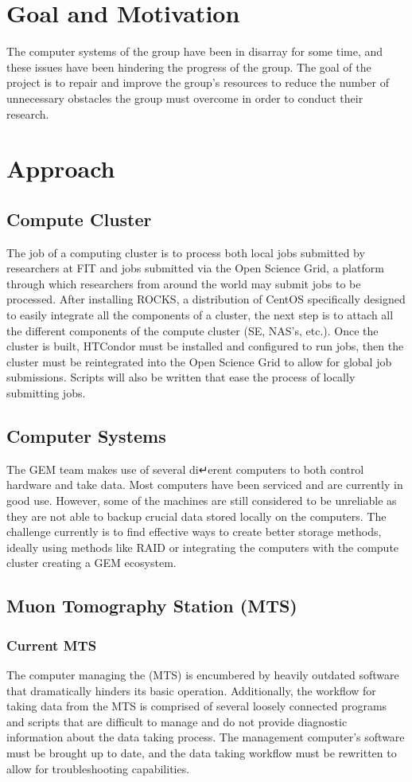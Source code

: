 \documentclass[12pt]{article}
\newcommand\tab[1][1cm]{\hspace*{#1}}
\begin{document}
\section{Goal and Motivation}
\tab The computer systems of the group have been in disarray for
some time, and these issues have been hindering the progress of
the group. The goal of the project is to repair and improve the
group’s resources to reduce the number of unnecessary obstacles
the group must overcome in order to conduct their research.
\section{Approach}
\subsection{Compute Cluster}
\tab The job of a computing cluster is to process both local jobs
submitted by researchers at FIT and jobs submitted via the Open
Science Grid, a platform through which researchers from around
the world may submit jobs to be processed. After installing
ROCKS, a distribution of CentOS specifically designed to easily
integrate all the components of a cluster, the next
step is to attach all the different components
of the compute cluster (SE, NAS's, etc.). Once the cluster is built,
HTCondor must be installed and configured to run jobs, then the
cluster must be reintegrated into the Open Science Grid to allow
for global job submissions. Scripts will also be written that ease
the process of locally submitting jobs.
\subsection{Computer Systems}
\tab The GEM team makes use of several di↵erent computers to
both control hardware and take data. Most computers have been serviced
and are currently in good use. However, some of the machines are
still considered to be unreliable as they are not able to backup
crucial data stored locally on the computers. The challenge currently
is to find effective ways to create better storage methods, ideally
using methods like RAID or integrating the computers with the compute
cluster creating a GEM ecosystem.
\subsection{Muon Tomography Station (MTS)}
\subsubsection{Current MTS}
\tab The computer managing the (MTS) is encumbered by heavily outdated software that dramatically hinders its basic operation. Additionally, the workflow for taking data from the MTS is
comprised of several loosely connected programs and scripts that
are difficult to manage and do not provide diagnostic information
about the data taking process. The management computer’s software must be brought up to date, and the data taking workflow must be rewritten to allow for troubleshooting capabilities.
\end{document}
